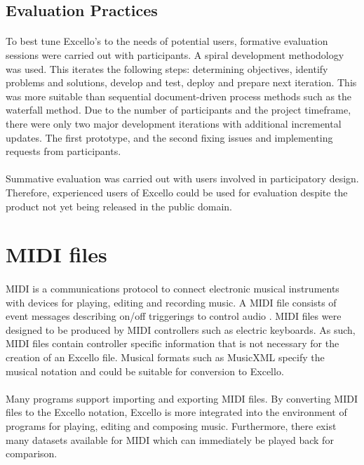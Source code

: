 \subsection{Evaluation Practices}

\paragraph{} To best tune Excello's to the needs of potential users, formative evaluation sessions were carried out with participants. A spiral development methodology \cite{boehm:spiral} was used. This iterates the following steps: determining objectives, identify problems and solutions, develop and test, deploy and prepare next iteration. This was more suitable than sequential document-driven process methods such as the waterfall method. Due to the number of participants and the project timeframe, there were only two major development iterations with additional incremental updates. The first prototype, and the second fixing issues and implementing requests from participants.

\paragraph{} Summative evaluation was carried out with users involved in participatory design. Therefore, experienced users of Excello could be used for evaluation despite the product not yet being released in the public domain.

\section{MIDI files}

\paragraph{} MIDI is a communications protocol to connect electronic musical instruments with devices for playing, editing and recording music. A MIDI file consists of event messages describing on/off triggerings to control audio \cite{huber:midimanual}. MIDI files were designed to be produced by MIDI controllers such as electric keyboards. As such, MIDI files contain controller specific information that is not necessary for the creation of an Excello file. Musical formats such as MusicXML specify the musical notation and could be suitable for conversion to Excello.

\paragraph{} Many programs support importing and exporting MIDI files. By converting MIDI files to the Excello notation, Excello is more integrated into the environment of programs for playing, editing and composing music. Furthermore, there exist many datasets available for MIDI \cite{huang:deep} which can immediately be played back for comparison.
